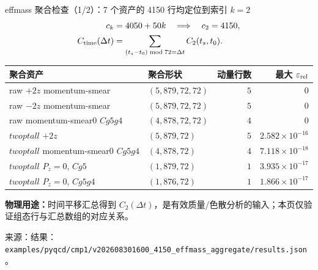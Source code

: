 \documentclass[UTF8,aspectratio=169,11pt]{ctexbeamer}
\newcommand{\source}[1]{\vspace{0.05em}\par{\raggedright\scriptsize\color{muted}来源：#1\par}}
\newcommand{\codepath}[1]{\nolinkurl{#1}}
\begin{document}
\begin{frame}[t]{effmass 聚合检查（1/2）：7 个资产的 4150 行均定位到索引 $k=2$}
  \footnotesize
  \begin{align*}
    c_k&=4050+50k\quad\Longrightarrow\quad c_2=4150,\\
    C_{\rm time}(\Delta t)&=\sum_{(t_s-t_0)\bmod72=\Delta t}C_2(t_s,t_0).
  \end{align*}
  \begin{tabularx}{0.96\textwidth}{@{}Y l r r@{}}
    \toprule
    聚合资产 & 聚合形状 & 动量行数 & 最大 $\varepsilon_{\rm rel}$ \\
    \midrule
    raw $+2z$ momentum-smear & $(5,879,72,72)$ & $5$ & $0$ \\
    raw $-2z$ momentum-smear & $(5,879,72,72)$ & $5$ & $0$ \\
    raw momentum-smear0 $Cg5g4$ & $(4,878,72,72)$ & $4$ & $0$ \\
    $twoptall$ $+2z$ & $(5,879,72)$ & $5$ & $2.582\times10^{-16}$ \\
    $twoptall$ momentum-smear0 $Cg5g4$ & $(4,878,72)$ & $4$ & $7.118\times10^{-18}$ \\
    $twoptall$ $P_z=0$, $Cg5$ & $(1,879,72)$ & $1$ & $3.935\times10^{-17}$ \\
    $twoptall$ $P_z=0$, $Cg5g4$ & $(1,876,72)$ & $1$ & $1.866\times10^{-17}$ \\
    \bottomrule
  \end{tabularx}
  \par\vspace{0.12em}
  {\scriptsize
  \textbf{物理用途：}时间平移汇总得到 $C_2(\Delta t)$，是有效质量/色散分析的输入；本页仅验证组态行与汇总数组的对应关系。\par}
  \source{结果：\codepath{examples/pyqcd/cmp1/v202608301600_4150_effmass_aggregate/results.json}。}
\end{frame}
\end{document}
